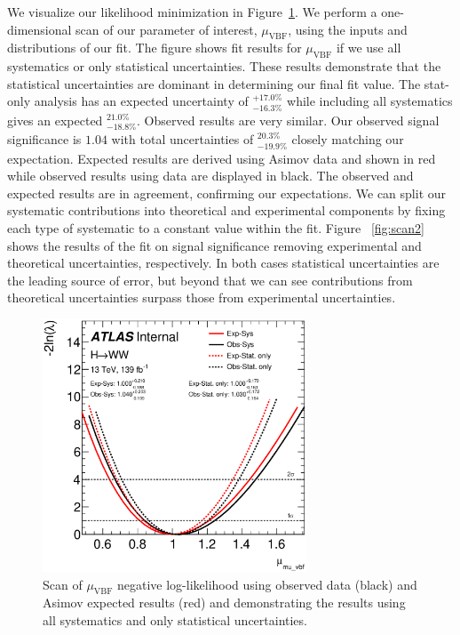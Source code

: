 We visualize our likelihood minimization in Figure~\ref{fig:scan}. We perform a one-dimensional scan of our parameter of interest, $\mu_{\text{VBF}}$, using the inputs and distributions of our fit. The figure shows fit results for $\mu_{\text{VBF}}$ if we use all systematics or only statistical uncertainties. These results demonstrate that the statistical uncertainties are dominant in determining our final fit value. The stat-only analysis has an expected uncertainty of $^{+17.0\%}_{-16.3\%}$ while including all systematics gives an expected $^{21.0\%}_{-18.8\%}$. Observed results are very similar. Our observed signal significance is $1.04$ with total uncertainties of $^{20.3\%}_{-19.9\%}$ closely matching our expectation. Expected results are derived using Asimov data and shown in red while observed results using data are displayed in black. The observed and expected results are in agreement, confirming our expectations. We can split our systematic contributions into theoretical and experimental components by fixing each type of systematic to a constant value within the fit. Figure ~\ref{fig:scan2} shows the results of the fit on signal significance removing experimental and theoretical uncertainties, respectively. In both cases statistical uncertainties are the leading source of error, but beyond that we can see contributions from theoretical uncertainties surpass those from experimental uncertainties.  

\begin{figure}[!h]
\centering
\includegraphics[width=0.7\textwidth]{Pictures/fitresults/mu_vbf_stattotal.eps}
\caption{Scan of $\mu_{\text{VBF}}$ negative log-likelihood using observed data (black) and Asimov expected results (red) and demonstrating the results using all systematics and only statistical uncertainties.}
\label{fig:scan}
\end{figure}


